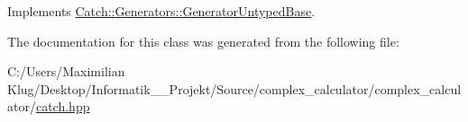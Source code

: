 Implements \mbox{\hyperlink{class_catch_1_1_generators_1_1_generator_untyped_base_aeed3c0cd6233c5f553549e453b8d6638}{Catch\+::\+Generators\+::\+Generator\+Untyped\+Base}}.



The documentation for this class was generated from the following file\+:\begin{DoxyCompactItemize}
\item 
C\+:/\+Users/\+Maximilian Klug/\+Desktop/\+Informatik\+\_\+\_\+\+Projekt/\+Source/complex\+\_\+calculator/complex\+\_\+calculator/\mbox{\hyperlink{catch_8hpp}{catch.\+hpp}}\end{DoxyCompactItemize}
